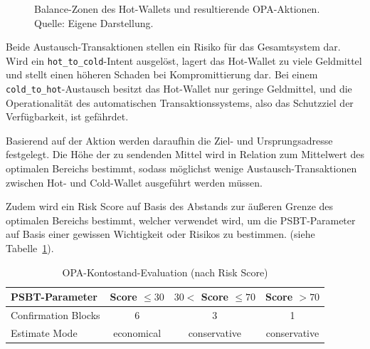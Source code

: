 \begin{figure}[htbp]
\centering
{}
\caption{Balance-Zonen des Hot-Wallets und resultierende \acs{OPA}-Aktionen.\\Quelle: Eigene Darstellung.}
\label{fig:balance_zonen}
\end{figure}

Beide Austausch-Transaktionen stellen ein Risiko für das Gesamtsystem dar. Wird ein \texttt{hot\_to\_cold}-Intent ausgelöst, lagert das Hot-Wallet zu viele Geldmittel und stellt einen höheren Schaden bei Kompromittierung dar. Bei einem \texttt{cold\_to\_hot}-Austausch besitzt das Hot-Wallet nur geringe Geldmittel, und die Operationalität des automatischen Transaktionssystems, also das Schutzziel der Verfügbarkeit, ist gefährdet.

Basierend auf der Aktion werden daraufhin die Ziel- und Ursprungsadresse festgelegt. Die Höhe der zu sendenden Mittel wird in Relation zum Mittelwert des optimalen Bereichs bestimmt, sodass möglichst wenige Austausch-Transaktionen zwischen Hot- und Cold-Wallet ausgeführt werden müssen.

Zudem wird ein Risk Score auf Basis des Abstands zur äußeren Grenze des optimalen Bereichs bestimmt, welcher verwendet wird, um die \ac{PSBT}-Parameter auf Basis einer gewissen Wichtigkeit oder Risikos zu bestimmen. (siehe Tabelle~\ref{tab:OPA_fundSwitch}).
\begin{table}[htbp]
\centering
\begin{tabular}{l c c c}
\toprule
\textbf{\ac{PSBT}-Parameter} & \textbf{Score $\le 30$} & \textbf{$30 <$ Score $\le 70$} & \textbf{Score $> 70$} \\
\midrule
Confirmation Blocks & 6 & 3 & 1 \\
Estimate Mode & economical & conservative & conservative \\
\bottomrule
\end{tabular}
\caption{\acs{OPA}-Kontostand-Evaluation (nach Risk Score)}
\label{tab:OPA_fundSwitch}
\end{table}

